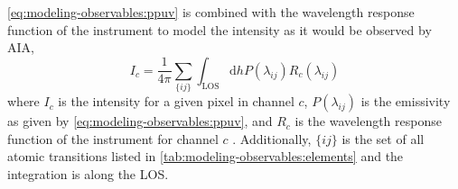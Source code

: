 \autoref{eq:modeling-observables:ppuv} is combined with the wavelength response function of the instrument to model the intensity as it would be observed by AIA,
\begin{equation}\label{eq:modeling-observables:intensity}
    I_c = \frac{1}{4\pi}\sum_{\{ij\}}\int_{\text{LOS}}\mathrm{d}hP(\lambda_{ij})R_c(\lambda_{ij})
\end{equation}
where $I_c$ is the intensity for a given pixel in channel $c$, $P(\lambda_{ij})$ is the emissivity as given by \autoref{eq:modeling-observables:ppuv}, and $R_c$ is the wavelength response function of the instrument for channel $c$ \citep[see \autoref{fig:aia-wavelength-response} and][]{boerner_initial_2012}. Additionally, $\{ij\}$ is the set of all atomic transitions listed in \autoref{tab:modeling-observables:elements} and the integration is along the LOS. 

